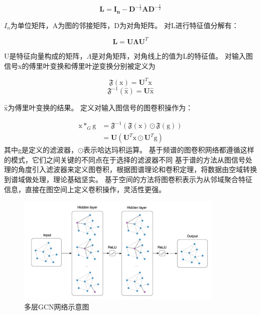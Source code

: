 \begin{equation}
\mathbf{L}=\mathbf{I}_{\mathbf{n}}-\mathbf{D}^{-\frac{1}{2}} \mathbf{A} \mathbf{D}^{-\frac{1}{2}}
\end{equation}

\noindent $I_n$为单位矩阵，A为图的邻接矩阵，D为对角矩阵。
对L进行特征值分解有：

\begin{equation}
\mathbf{L}=\mathbf{U} \mathbf{\Lambda} \mathbf{U}^{T}
\end{equation}

\noindent U是特征向量构成的矩阵，$\Lambda$是对角矩阵，对角线上的值为L的特征值。
对输入图信号x的傅里叶变换和傅里叶逆变换分别被定义为

\begin{equation}
\mathfrak{F}(\mathrm{x})=\mathbf{U}^{T} \mathrm{x} 
\end{equation}
\begin{equation}
\mathfrak{F}^{-1}(\hat{\mathrm{x}})=\mathbf{U} \hat{\mathrm{x}}
\end{equation}

\noindent $\hat{\mathrm{x}}$为傅里叶变换的结果。
定义对输入图信号的图卷积操作为：

\begin{equation}
\begin{aligned}
\mathrm{x} *_{G} \mathrm{g} &=\mathfrak{F}^{-1}(\mathfrak{F}(\mathrm{x}) \odot \mathfrak{F}(\mathrm{g})) \\
&=\mathbf{U}\left(\mathbf{U}^{T} \mathrm{x} \odot \mathbf{U}^{T} \mathrm{g}\right)
\end{aligned}
\end{equation}
\noindent 其中g是定义的滤波器，$\odot$表示哈达玛积运算。
基于频谱的图卷积网络都遵循这样的模式，它们之间关键的不同点在于选择的滤波器不同
基于谱的方法从图信号处理的角度引入滤波器来定义图卷积，根据图谱理论和卷积定理，将数据由空域转换到谱域做处理，理论基础坚实。
基于空间的方法将图卷积表示为从邻域聚合特征信息，直接在图空间上定义卷积操作，灵活性更强。




\begin{figure}[htp]
	\centering
	\includegraphics[width=0.88\textwidth]{figures/GCN.png}
	\caption{多层GCN网络示意图}
	\label{fig:gcn}
\end{figure}


